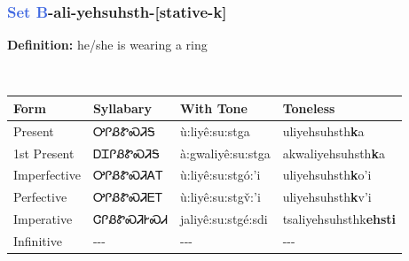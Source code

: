 \subsubsection*{\textcolor{RoyalBlue}{Set B}{-}ali{-}\textbf{yehsuhsth}{-}[stative-k]}
\nopagebreak
\textbf{Definition: } he/she is wearing a ring
\\[0.5em]
\begin{tabularx}{\textwidth}{l X X X}%
\toprule%
\textbf{Form}&\textbf{Syllabary}&\textbf{With Tone}&\textbf{Toneless}\\%
\midrule%
Present&ᎤᎵᏰᏑᏍᏘᎦ&ù:liyê:su:stga&uliyehsuhsth\textbf{k}a\\%
1st Present&ᎠᏆᎵᏰᏑᏍᏘᎦ&à:gwaliyê:su:stga&akwaliyehsuhsth\textbf{k}a\\%
Imperfective&ᎤᎵᏰᏑᏍᏘᎪᎢ&ù:liyê:su:stgó:’i&uliyehsuhsth\textbf{k}o'i\\%
Perfective&ᎤᎵᏰᏑᏍᏘᎬᎢ&ù:liyê:su:stgv̌:’i&uliyehsuhsth\textbf{k}v'i\\%
Imperative&ᏣᎵᏰᏑᏍᏘᎨᏍᏗ&jaliyê:su:stgé:sdi&tsaliyehsuhsthk\textbf{ehsti}\\%
Infinitive&{-}{-}{-}&{-}{-}{-}&{-}{-}{-}\\%
\bottomrule%
\end{tabularx}
\\[1em]